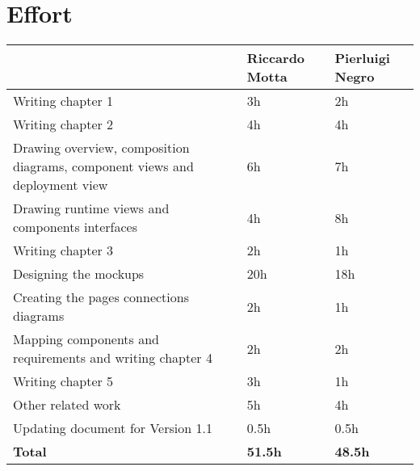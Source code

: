 \section{Effort}

\begin{center}
    \begin{tabular}{ | >{\arraybackslash}m{} | >{\centering\arraybackslash}m{} | >{\centering\arraybackslash}m{} | }
        \hline
        \multicolumn{1}{|c|}{\textbf{Task}} & \textbf{Riccardo Motta} & \textbf{Pierluigi Negro} \\
        \hline
        \hline
        Writing chapter 1 & 3h & 2h \\
        \hline
        Writing chapter 2 & 4h & 4h \\
        \hline
        Drawing overview, composition diagrams, component views and deployment view & 6h & 7h \\
        \hline
        Drawing runtime views and components interfaces & 4h & 8h \\
        \hline
        Writing chapter 3 & 2h & 1h \\
        \hline
        Designing the mockups & 20h & 18h \\
        \hline
        Creating the pages connections diagrams & 2h & 1h \\
        \hline
        Mapping components and requirements and writing chapter 4 & 2h & 2h \\
        \hline
        Writing chapter 5 & 3h & 1h \\
        \hline
        Other related work & 5h & 4h \\
        \hline
        Updating document for Version 1.1 & 0.5h & 0.5h \\
        \hline
        \hline
        \textbf{Total} & \textbf{51.5h} & \textbf{48.5h} \\
        \hline
    \end{tabular}
\end{center}

